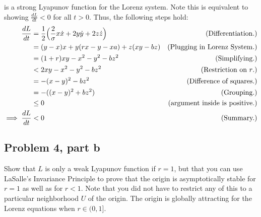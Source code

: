 \begin{solution}
is a strong Lyapunov function for the Lorenz system. Note this is equivalent to showing $\frac{dL}{dt} < 0$ for all $t > 0$. Thus, the following steps hold:
\alignbreak
\begin{align}
    \frac{dL}{dt} &= \frac{1}{2}\Big( \frac{2}{\sigma}x\dot{x} + 2y\dot{y} + 2z\dot{z} \Big)&\text{(Differentiation.)}\nonumber\\
    &= (y - x)x + y(rx - y - xa) + z(xy - bz) &\text{(Plugging in Lorenz System.)}\nonumber\\
    &= (1 + r) xy - x^2 - y^2 - bz^2 &\text{(Simplifying.)}\nonumber\\
    &< 2xy - x^2 - y^2 - bz^2 &\text{(Restriction on $r$.)}\nonumber\\
    &= -(x - y)^2 - bz^2 &\text{(Difference of squares.)}\nonumber\\
    &= -((x - y)^2 + bz^2) &\text{(Grouping.)}\nonumber\\
    &\leq 0 &\text{(argument inside is positive.)}\nonumber\\
\implies \frac{dL}{dt} &< 0 &\text{(Summary.)}\nonumber
\end{align}
\alignbreak
\end{solution}

\newpage
\subsection{Problem 4, part b}
Show that $L$ is only a weak Lyapunov function if $r = 1$, but that you can use LaSalle's Invariance Principle to prove that the origin is asymptotically stable for $r = 1$ as well as for $r < 1$. Note that you did not have to restrict any of this to a particular neighborhood $U$ of the origin. The origin is globally attracting for the Lorenz equations when $r \in (0, 1]$.

